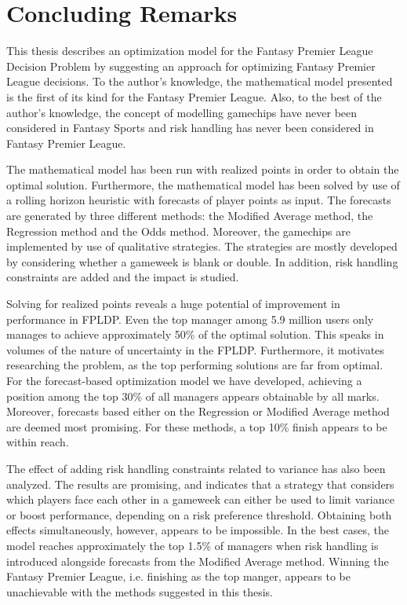\chapter{Concluding Remarks}

This thesis describes an optimization model for the Fantasy Premier League Decision Problem by suggesting an approach for optimizing Fantasy Premier League decisions. To the author's knowledge, the mathematical model presented is the first of its kind for the Fantasy Premier League. Also, to the best of the author's knowledge, the concept of modelling gamechips have never been considered in Fantasy Sports and risk handling has never been considered in Fantasy Premier League.

\newpar

The mathematical model has been run with realized points in order to obtain the optimal solution. Furthermore, the mathematical model has been solved by use of a rolling horizon heuristic with forecasts of player points as input. The forecasts are generated by three different methods: the Modified Average method, the Regression method and the Odds method. Moreover, the gamechips are implemented by use of qualitative strategies. The strategies are mostly developed by considering whether a gameweek is blank or double. In addition, risk handling constraints are added and the impact is studied.

\newpar

Solving for realized points reveals a huge potential of improvement in performance in FPLDP. Even the top manager among 5.9 million users only manages to achieve approximately 50\% of the optimal solution. This speaks in volumes of the nature of uncertainty in the FPLDP. Furthermore, it motivates researching the problem, as the top performing solutions are far from optimal. For the forecast-based optimization model we have developed, achieving a position among the top 30\% of all managers appears obtainable by all marks. Moreover, forecasts based either on the Regression or Modified Average method are deemed most promising. For these methods, a top 10\% finish appears to be within reach. 


\newpar

The effect of adding risk handling constraints related to variance has also been analyzed. The results are promising, and indicates that a strategy that considers which players face each other in a gameweek can either be used to limit variance or boost performance, depending on a risk preference threshold. Obtaining both effects simultaneously, however, appears to be impossible. In the best cases, the model reaches approximately the top 1.5\% of managers when risk handling is introduced alongside forecasts from the Modified Average method. Winning the Fantasy Premier League, i.e. finishing as the top manger, appears to be unachievable with the methods suggested in this thesis.

